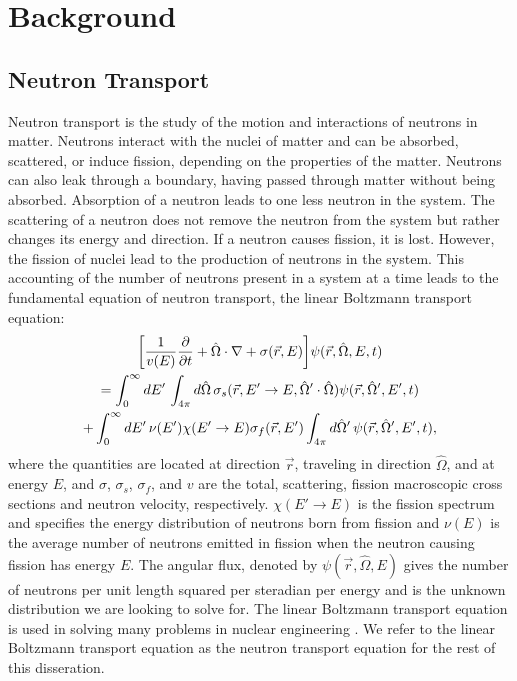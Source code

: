 \chapter{Background}

\section{Neutron Transport}

Neutron transport is the study of the motion and interactions of neutrons in matter. Neutrons interact with the nuclei of matter and can be absorbed, scattered, or induce fission, depending on the properties of the matter. Neutrons can also leak through a boundary, having passed through matter without being absorbed. Absorption of a neutron leads to one less neutron in the system. The scattering of a neutron does not remove the neutron from the system but rather changes its energy and direction. If a neutron causes fission, it is lost. However, the fission of nuclei lead to the production of neutrons in the system. This accounting of the number of neutrons present in a system at a time leads to the fundamental equation of neutron transport, the linear Boltzmann transport equation:
\begin{multline}
	\bigg [ \frac{1}{v(E)} \frac{\partial}{\partial t} + \hat{\Omega} \cdot \nabla + \sigma(\vec{r},E) \bigg ] \psi(\vec{r},\hat{\Omega},E,t) \\ = \int_{0}^{\infty} \mathop{}\!d E' \, \int_{4\pi} \mathop{}\!d \hat{\Omega} \, \sigma_{s}(\vec{r},E'\rightarrow E,\hat{\Omega}' \cdot \hat{\Omega}) \psi(\vec{r},\hat{\Omega}',E',t) \\ + \int_{0}^{\infty} \mathop{}\!d E' \, \nu(E') \chi(E'\rightarrow E) \sigma_{f}(\vec{r},E') \int_{4\pi} \mathop{}\!d \hat{\Omega}' \, \psi(\vec{r},\hat{\Omega}',E',t), 
	\label{eq:NeutronTransport}
\end{multline}
where the quantities are located at direction $\vec{r}$, traveling in direction $\hat{\Omega}$, and at energy $E$, and $\sigma$, $\sigma_{s}$, $\sigma_{f}$, and $v$ are the total, scattering, fission macroscopic cross sections and neutron velocity, respectively. $\chi(E'\rightarrow E)$ is the fission spectrum and specifies the energy distribution of neutrons born from fission and $\nu(E)$ is the average number of neutrons emitted in fission when the neutron causing fission has energy $E$. The angular flux, denoted by $\psi(\vec{r},\hat{\Omega},E)$ gives the number of neutrons per unit length squared per steradian per energy and is the unknown distribution we are looking to solve for. The linear Boltzmann transport equation is used in solving many problems in nuclear engineering \cite{duderstadt_nuclear_1976}. We refer to the linear Boltzmann transport equation as the neutron transport equation for the rest of this disseration.

